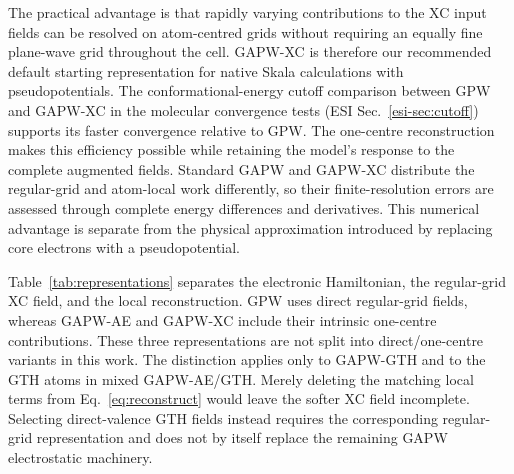 \documentclass[10pt,a4paper,twocolumn]{article}
\begin{document}
The practical advantage is that rapidly varying contributions to the XC input fields can be resolved on atom-centred grids without requiring an equally fine plane-wave grid throughout the cell. GAPW-XC is therefore our recommended default starting representation for native Skala calculations with pseudopotentials. The conformational-energy cutoff comparison between GPW and GAPW-XC in the molecular convergence tests (ESI Sec.~\ref{esi-sec:cutoff}) supports its faster convergence relative to GPW. The one-centre reconstruction makes this efficiency possible while retaining the model's response to the complete augmented fields. Standard GAPW and GAPW-XC distribute the regular-grid and atom-local work differently, so their finite-resolution errors are assessed through complete energy differences and derivatives. This numerical advantage is separate from the physical approximation introduced by replacing core electrons with a pseudopotential.

Table~\ref{tab:representations} separates the electronic Hamiltonian, the regular-grid XC field, and the local reconstruction. GPW uses direct regular-grid fields, whereas GAPW-AE and GAPW-XC include their intrinsic one-centre contributions. These three representations are not split into direct/one-centre variants in this work. The distinction applies only to GAPW-GTH and to the GTH atoms in mixed GAPW-AE/GTH. Merely deleting the matching local terms from Eq.~\eqref{eq:reconstruct} would leave the softer XC field incomplete. Selecting direct-valence GTH fields instead requires the corresponding regular-grid representation and does not by itself replace the remaining GAPW electrostatic machinery.
\end{document}
